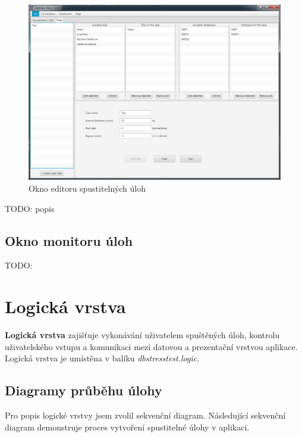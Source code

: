 \documentclass[czech,bachelor,public,dept460,male,cpdeclaration,twoside]{diploma}
\begin{document}
\newpage
\begin{figure}[!htbp]\centering\includegraphics[width=1.0\textwidth]{Figures/taskeditor.png}\caption{Okno editoru spustitelných úloh}
\end{figure}

TODO: popis

\newpage
\subsection{Okno monitoru úloh}
TODO:


\newpage
\section{Logická vrstva} \label{logiclayer}
\textbf{Logická vrstva} zajišťuje vykonávání uživatelem spuštěných úloh, kontrolu uživatelského vstupu a komunikaci mezi datovou a prezentační vrstvou aplikace. Logická vrstva je umístěna v balíku \textit{dbstresstest.logic}.
\subsection{Diagramy průběhu úlohy} \label{logic}
Pro popis logické vrstvy jsem zvolil sekvenční diagram. Následující sekvenční diagram demonstruje proces vytvoření spustitelné úlohy v aplikaci.
\end{document}
